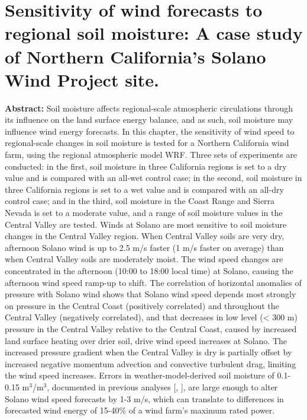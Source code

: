 \chapter{Sensitivity of wind forecasts to regional soil moisture: A case study of Northern California's Solano Wind Project site.}
\label{c.wind}

\textbf{Abstract:}  Soil moisture affects regional-scale atmospheric circulations through its influence on the land surface energy balance, and as such, soil moisture may influence wind energy forecasts.  In this chapter, the sensitivity of wind speed to regional-scale changes in soil moisture is tested for a Northern California wind farm, using the regional atmospheric model WRF.  Three sets of experiments are conducted: in the first, soil moisture in three California regions is set to a dry value and is compared with an all-wet control case; in the second, soil moisture in three California regions is set to a wet value and is compared with an all-dry control case; and in the third, soil moisture in the Coast Range and Sierra Nevada is set to a moderate value, and a range of soil moisture values in the Central Valley are tested.  Winds at Solano are most sensitive to soil moisture changes in the Central Valley region.  When Central Valley soils are very dry, afternoon Solano wind is up to 2.5 m/s faster (1 m/s faster on average) than when Central Valley soils are moderately moist.  The wind speed changes are concentrated in the afternoon (10:00 to 18:00 local time) at Solano, causing the afternoon wind speed ramp-up to shift.  The correlation of horizontal anomalies of pressure with Solano wind shows that Solano wind speed depends most strongly on pressure in the Central Coast (positively correlated) and throughout the Central Valley (negatively correlated), and that decreases in low level (< 300 m) pressure in the Central Valley relative to the Central Coast, caused by increased land surface heating over drier soil, drive wind speed increases at Solano.  The increased pressure gradient when the Central Valley is dry is partially offset by increased negative momentum advection and convective turbulent drag, limiting the wind speed increases.  Errors in weather-model-derived soil moisture of 0.1-0.15 m$^3$/m$^3$, documented in previous analyses [\cite{marshall2003impact}, \cite{godfrey2008soil}], are large enough to alter Solano wind speed forecasts by 1-3 m/s, which can translate to differences in forecasted wind energy of 15-40\% of a wind farm's maximum rated power.








